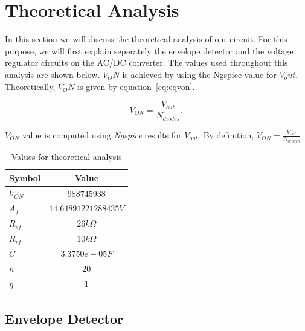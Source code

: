 \newpage
\section{Theoretical Analysis}
\label{sec:analysis}

In this section we will discuss the theoretical analysis of our circuit. For this purpose, we will first explain seperately the envelope detector and the voltage regulator circuits on the AC/DC converter. The values used throughout this analysis are shown below. $V_ON$ is achieved by using the Ngspice value for $V_out$. Theoretically, $V_ON$ is given by equation~\ref{eq:eqvon}.

\begin{equation}
  V_{ON} = \frac{V_{out}}{N_{diodes}},
  \label{eq:eqvon}
\end{equation}

$V_{ON}$ value is computed using \textit{Ngspice} results for $V_{out}$. By definition, $V_{ON}=\frac{V_{out}}{N_{diodes}}$
\begin{table}[h]
    \centering
    \begin{tabular}{|l|c|}
    \hline
    {\bf Symbol} & {\bf Value} \\ \hline
    $V_{ON}$ & $988745938$ \\ \hline
    $A_f$ & $14.64891221288435 V$ \\ \hline
    $R_{ef}$ & $26 k\Omega$  \\ \hline
    $R_{rf}$ & $10 k\Omega$\\ \hline
    $C$ & $3.3750e-05 F$ \\ \hline
    $n$\footnotemark & $20$  \\ \hline
    $\eta$ & $1$  \\ \hline
    \end{tabular}
    \caption{Values for theoretical analysis}
    \label{tab:values}
\end{table}


\subsection{Envelope Detector}
\label{sec:envelope}


